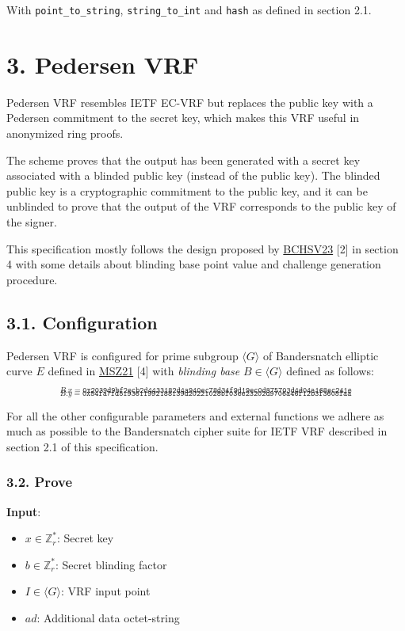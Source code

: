 \documentclass[
]{article}
\providecommand{\tightlist}{%
  \setlength{\itemsep}{0pt}\setlength{\parskip}{0pt}}
\begin{document}
With \texttt{point\_to\_string}, \texttt{string\_to\_int} and
\texttt{hash} as defined in section 2.1.

\hypertarget{pedersen-vrf}{%
\section{3. Pedersen VRF}\label{pedersen-vrf}}

Pedersen VRF resembles IETF EC-VRF but replaces the public key with a
Pedersen commitment to the secret key, which makes this VRF useful in
anonymized ring proofs.

The scheme proves that the output has been generated with a secret key
associated with a blinded public key (instead of the public key). The
blinded public key is a cryptographic commitment to the public key, and
it can be unblinded to prove that the output of the VRF corresponds to
the public key of the signer.

This specification mostly follows the design proposed by
\href{https://eprint.iacr.org/2023/002}{BCHSV23} {[}2{]} in section 4
with some details about blinding base point value and challenge
generation procedure.

\hypertarget{configuration-1}{%
\subsection{3.1. Configuration}\label{configuration-1}}

Pedersen VRF is configured for prime subgroup \(\langle G \rangle\) of
Bandersnatch elliptic curve \(E\) defined in
\href{https://eprint.iacr.org/2021/1152}{MSZ21} {[}4{]} with
\emph{blinding base} \(B \in \langle G \rangle\) defined as follows:

\[_{B.x = \texttt{0x2039d9bf2ecb2d4433182d4a940ec78d34f9d19ec0d875703d4d04a168ec241e}}\]
\[_{B.y = \texttt{0x54fa7fd5193611992188139d20221028bf03ee23202d9706a46f12b3f3605faa}}\]

For all the other configurable parameters and external functions we
adhere as much as possible to the Bandersnatch cipher suite for IETF VRF
described in section 2.1 of this specification.

\hypertarget{prove-1}{%
\subsubsection{3.2. Prove}\label{prove-1}}

\textbf{Input}:

\begin{itemize}
\tightlist
\item
  \(x \in \mathbb{Z}^*_r\): Secret key
\item
  \(b \in \mathbb{Z}^*_r\): Secret blinding factor
\item
  \(I \in \langle G \rangle\): VRF input point
\item
  \(ad\): Additional data octet-string
\end{itemize}
\end{document}
